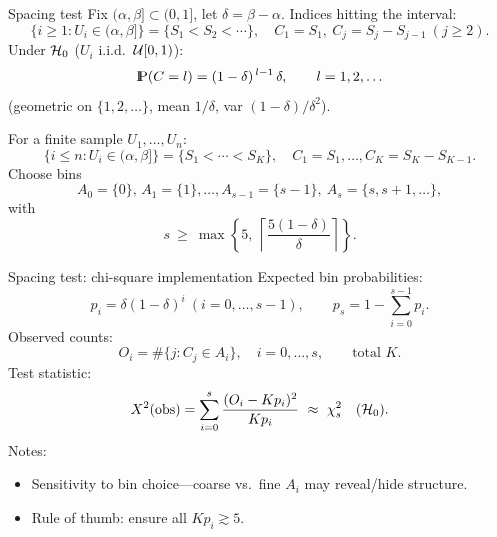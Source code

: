 \documentclass[aspectratio=169]{beamer}
\newcommand{\Prob}{{\rm I\hspace{-0.8mm}P}}
\begin{document}

\begin{frame}{Spacing test}
Fix $(\alpha,\beta] \subset (0,1]$, let $\delta=\beta-\alpha$.
Indices hitting the interval:
\[
\{i\ge1: U_i\in(\alpha,\beta]\}=\{S_1<S_2<\cdots\},\quad
C_1=S_1,\ C_j=S_j-S_{j-1}\ (j\ge2).
\]
Under ${\cal H}_0$ ($U_i$ i.i.d.\ ${\cal U}[0,1)$):
\[
\Prob(C=l)= (1-\delta)^{\,l-1}\,\delta,\qquad l=1,2,\ldots
\]
(geometric on $\{1,2,\ldots\}$, mean $1/\delta$, var $(1-\delta)/\delta^2$).

For a finite sample $U_1,\ldots,U_n$:
\[
\{i\le n: U_i\in(\alpha,\beta]\}=\{S_1<\cdots<S_K\},\quad
C_1=S_1,\ldots, C_K=S_K-S_{K-1}.
\]
Choose bins
\[
A_0=\{0\},\,A_1=\{1\},\ldots,A_{s-1}=\{s-1\},\ A_s=\{s,s+1,\ldots\},
\]
with
\[
s\ \ge\ \max\!\left\{5,\ \left\lceil \frac{5(1-\delta)}{\delta}\right\rceil\right\}.
\]
\end{frame}


\begin{frame}{Spacing test: chi-square implementation}
Expected bin probabilities:
\[
p_i=\delta(1-\delta)^i\ (i=0,\ldots,s-1),\qquad
p_s=1-\sum_{i=0}^{s-1}p_i.
\]
Observed counts:
\[
O_i=\#\{j: C_j\in A_i\},\quad i=0,\ldots,s,\qquad \text{total }K.
\]
Test statistic:
\[
X^2(\text{obs})=\sum_{i=0}^{s}\frac{(O_i-Kp_i)^2}{Kp_i}\ \approx\ \chi^2_s\quad(\calH_0).
\]
Notes:
\begin{itemize}
  \item Sensitivity to bin choice—coarse vs.\ fine \(A_i\) may reveal/hide structure.
  \item Rule of thumb: ensure all \(Kp_i\gtrsim 5\).
\end{itemize}
\end{frame}
\end{document}
